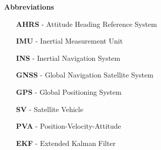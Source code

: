 \makenomenclature
\renewcommand{\nomname}{Nomenclature} %
\renewcommand\nomgroup[1]{%
  \item[\bfseries
  \ifstrequal{#1}{G}{GNSS}{%
  \ifstrequal{#1}{N}{Kalman filter}{%
  \ifstrequal{#1}{O}{Other Symbols}{}}}%
]}
\renewcommand{\nompreamble}{}

\mbox{}


\printnomenclature
\vspace{0.5cm}
{\Large\bf Abbreviations}
\begin{enumerate}[labelwidth=4em,leftmargin =\labelwidth]
\item [\textbf{AHRS}] - Attitude Heading Reference System
\item [\textbf{IMU}] - Inertial Measurement Unit
\item [\textbf{INS}] - Inertial Navigation System
\item [\textbf{GNSS}] - Global Navigation Satellite System
\item [\textbf{GPS}] - Global Positioning System
\item [\textbf{SV}] - Satellite Vehicle
\item [\textbf{PVA}] - Position-Velocity-Attitude
\item [\textbf{EKF}] - Extended Kalman Filter
\end{enumerate}